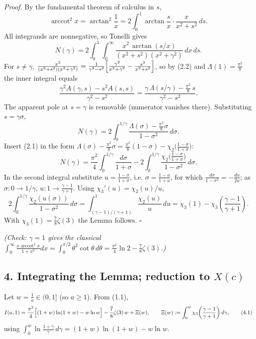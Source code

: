 \documentclass[11pt]{article}
\theoremstyle{remark}
\begin{document}
\emph{Proof.} By the fundamental theorem of calculus in $s$,
\[\operatorname{arccot}^2x=\arctan^2\frac1x=2\int_0^1\arctan\frac sx\cdot\frac{x}{x^2+s^2}\,ds .\]
All integrands are nonnegative, so Tonelli gives
\[N(\gamma)=2\int_0^1\!\!\int_0^\infty\frac{x^2\,\arctan(s/x)}{(x^2+s^2)(x^2+\gamma^2)}\,dx\,ds .\]
For $s\neq\gamma$,
$\frac{x^2}{(x^2+s^2)(x^2+\gamma^2)}=\frac{1}{\gamma^2-s^2}\Bigl[\frac{\gamma^2}{x^2+\gamma^2}-\frac{s^2}{x^2+s^2}\Bigr]$,
so by (2.2) and $\Lambda(1)=\frac{\pi^2}8$ the inner integral equals
\[\frac{\gamma^2 A(\gamma,s)-s^2A(s,s)}{\gamma^2-s^2}
=\frac{\gamma\,\Lambda(s/\gamma)-\frac{\pi^2}{8}\,s}{\gamma^2-s^2}.\]
The apparent pole at $s=\gamma$ is removable (numerator vanishes there). Substituting $s=\gamma\sigma$,
\begin{equation}
N(\gamma)=2\int_0^{1/\gamma}\frac{\Lambda(\sigma)-\frac{\pi^2}{8}\sigma}{1-\sigma^2}\,d\sigma . \tag{3.1}
\end{equation}
Insert (2.1) in the form $\Lambda(\sigma)-\frac{\pi^2}{8}\sigma=\frac{\pi^2}{8}(1-\sigma)-\chi_2\bigl(\frac{1-\sigma}{1+\sigma}\bigr)$:
\[N(\gamma)=\frac{\pi^2}{4}\int_0^{1/\gamma}\frac{d\sigma}{1+\sigma}
-2\int_0^{1/\gamma}\frac{\chi_2\bigl(\frac{1-\sigma}{1+\sigma}\bigr)}{1-\sigma^2}\,d\sigma .\]
In the second integral substitute $u=\frac{1-\sigma}{1+\sigma}$, i.e. $\sigma=\frac{1-u}{1+u}$, for which $\frac{d\sigma}{1-\sigma^2}=-\frac{du}{2u}$; as $\sigma:0\to 1/\gamma$, $u:1\to\frac{\gamma-1}{\gamma+1}$. Using $\chi_3'(u)=\chi_2(u)/u$,
\[2\int_0^{1/\gamma}\frac{\chi_2(u(\sigma))}{1-\sigma^2}\,d\sigma
=\int_{(\gamma-1)/(\gamma+1)}^{1}\frac{\chi_2(u)}{u}\,du
=\chi_3(1)-\chi_3\!\left(\frac{\gamma-1}{\gamma+1}\right).\]
With $\chi_3(1)=\frac78\zeta(3)$ the Lemma follows. $\square$

\emph{(Check: $\gamma=1$ gives the classical $\int_0^\infty\frac{x\operatorname{arccot}^2x}{1+x^2}dx=\int_0^{\pi/2}\theta^2\cot\theta\,d\theta=\frac{\pi^2}{4}\ln2-\frac78\zeta(3)$.)}

\subsection*{4. Integrating the Lemma; reduction to $X(c)$}

Let $w=\frac1a\in(0,1]$ (so $a\ge1$). From (1.1),
\begin{equation}
I(a,1)=\frac{\pi^2}{4}\Bigl[(1+w)\ln(1+w)-w\ln w\Bigr]-\frac{7}{8}\zeta(3)\,w+\Xi(w),
\qquad \Xi(w):=\int_0^{w}\chi_3\!\left(\frac{\gamma-1}{\gamma+1}\right)d\gamma, \tag{4.1}
\end{equation}
using $\int_0^w\ln\frac{1+\gamma}{\gamma}\,d\gamma=(1+w)\ln(1+w)-w\ln w$.
\end{document}
